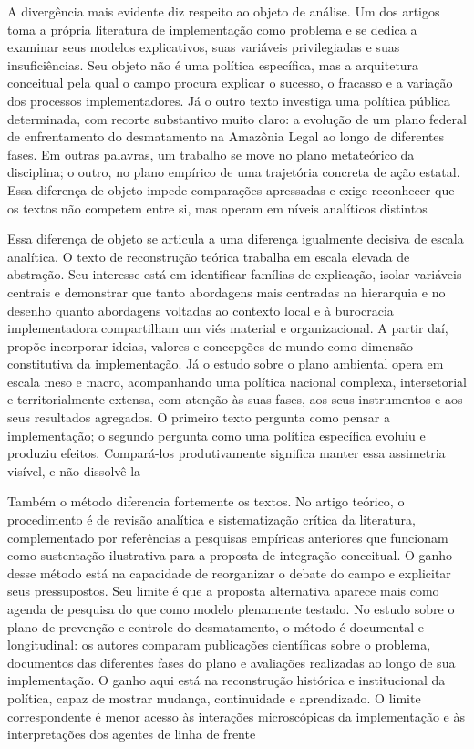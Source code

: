 \documentclass[12pt,a4paper]{article}
\begin{document}
A divergência mais evidente diz respeito ao objeto de análise. Um dos artigos toma a própria literatura de implementação como problema e se dedica a examinar seus modelos explicativos, suas variáveis privilegiadas e suas insuficiências. Seu objeto não é uma política específica, mas a arquitetura conceitual pela qual o campo procura explicar o sucesso, o fracasso e a variação dos processos implementadores. Já o outro texto investiga uma política pública determinada, com recorte substantivo muito claro: a evolução de um plano federal de enfrentamento do desmatamento na Amazônia Legal ao longo de diferentes fases. Em outras palavras, um trabalho se move no plano metateórico da disciplina; o outro, no plano empírico de uma trajetória concreta de ação estatal. Essa diferença de objeto impede comparações apressadas e exige reconhecer que os textos não competem entre si, mas operam em níveis analíticos distintos \parencite{ascenzi2013_implementacao_politicas,mello2017_evolucao_plano}

Essa diferença de objeto se articula a uma diferença igualmente decisiva de escala analítica. O texto de reconstrução teórica trabalha em escala elevada de abstração. Seu interesse está em identificar famílias de explicação, isolar variáveis centrais e demonstrar que tanto abordagens mais centradas na hierarquia e no desenho quanto abordagens voltadas ao contexto local e à burocracia implementadora compartilham um viés material e organizacional. A partir daí, propõe incorporar ideias, valores e concepções de mundo como dimensão constitutiva da implementação. Já o estudo sobre o plano ambiental opera em escala meso e macro, acompanhando uma política nacional complexa, intersetorial e territorialmente extensa, com atenção às suas fases, aos seus instrumentos e aos seus resultados agregados. O primeiro texto pergunta como pensar a implementação; o segundo pergunta como uma política específica evoluiu e produziu efeitos. Compará-los produtivamente significa manter essa assimetria visível, e não dissolvê-la \parencite{ascenzi2013_implementacao_politicas,mello2017_evolucao_plano}

Também o método diferencia fortemente os textos. No artigo teórico, o procedimento é de revisão analítica e sistematização crítica da literatura, complementado por referências a pesquisas empíricas anteriores que funcionam como sustentação ilustrativa para a proposta de integração conceitual. O ganho desse método está na capacidade de reorganizar o debate do campo e explicitar seus pressupostos. Seu limite é que a proposta alternativa aparece mais como agenda de pesquisa do que como modelo plenamente testado. No estudo sobre o plano de prevenção e controle do desmatamento, o método é documental e longitudinal: os autores comparam publicações científicas sobre o problema, documentos das diferentes fases do plano e avaliações realizadas ao longo de sua implementação. O ganho aqui está na reconstrução histórica e institucional da política, capaz de mostrar mudança, continuidade e aprendizado. O limite correspondente é menor acesso às interações microscópicas da implementação e às interpretações dos agentes de linha de frente \parencite{ascenzi2013_implementacao_politicas,mello2017_evolucao_plano}
\end{document}
